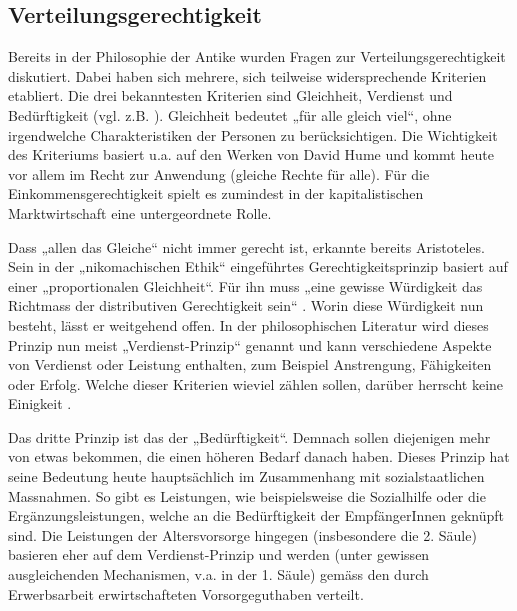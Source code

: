 \documentclass[a4paper,12pt]{article}
\renewcommand{\baselinestretch}{1.1}
\newif\ifcomments
\newcommand{\comment}[1]{%
    \ifcomments\marginpar{\renewcommand{\baselinestretch}{1}\tiny\hspace*{-1.1em}\colorbox{gray!20}%
    {\textcolor{red}{\parbox[t]{.9in}{\raggedright #1}}}}\fi}
\begin{document}
\subsection{Verteilungsgerechtigkeit}
\label{sec:ss3}

\comment{statistische D. hat viel mit Vorstellungen zu tun; ähnliche Hinweise
bei Literatur zur Abwertung von Frauenberufen; oder auch die Theorien zur
Spezialisierung aufgrund von Rollen}


Bereits in der Philosophie der Antike wurden Fragen zur
Verteilungsgerechtigkeit diskutiert. Dabei haben sich mehrere, sich teilweise
widersprechende Kriterien etabliert. Die drei bekanntesten Kriterien sind
Gleichheit, Verdienst und Bedürftigkeit (vgl. z.B.
\citealp{Deutsch-1975,Miller-1992,Sabbagh-2001}). Gleichheit bedeutet „für alle
gleich viel“, ohne irgendwelche Charakteristiken der Personen zu
berücksichtigen. Die Wichtigkeit des Kriteriums basiert u.a. auf den Werken von
David Hume und kommt heute vor allem im Recht zur Anwendung (gleiche Rechte für
alle). Für die Einkommensgerechtigkeit spielt es zumindest in der
kapitalistischen Marktwirtschaft eine untergeordnete Rolle.

Dass „allen das Gleiche“ nicht immer gerecht ist, erkannte bereits Aristoteles.
Sein in der „nikomachischen Ethik“ eingeführtes Gerechtigkeitsprinzip basiert
auf einer „proportionalen Gleichheit“. Für ihn muss „eine gewisse Würdigkeit
das Richtmass der distributiven Gerechtigkeit sein“
\citep[107]{Aristoteles-1985}. Worin diese Würdigkeit nun besteht, lässt er
weitgehend offen. In der philosophischen Literatur wird dieses Prinzip nun
meist „Verdienst-Prinzip“ genannt und kann verschiedene Aspekte von Verdienst
oder Leistung enthalten, zum Beispiel Anstrengung, Fähigkeiten oder Erfolg.
Welche dieser Kriterien wieviel zählen sollen, darüber herrscht keine Einigkeit
\citep{Lamont-1994}.

Das dritte Prinzip ist das der „Bedürftigkeit“. Demnach sollen diejenigen mehr
von etwas bekommen, die einen höheren Bedarf danach haben. Dieses Prinzip hat
seine Bedeutung heute hauptsächlich im Zusammenhang mit sozialstaatlichen
Massnahmen. So gibt es Leistungen, wie beispielsweise die Sozialhilfe oder die
Ergänzungsleistungen, welche an die Bedürftigkeit der EmpfängerInnen geknüpft
sind. Die Leistungen der Altersvorsorge hingegen (insbesondere die 2. Säule)
basieren eher auf dem Verdienst-Prinzip und werden (unter gewissen
ausgleichenden Mechanismen, v.a. in der 1. Säule) gemäss den durch
Erwerbsarbeit erwirtschafteten Vorsorgeguthaben verteilt. \\
\end{document}
